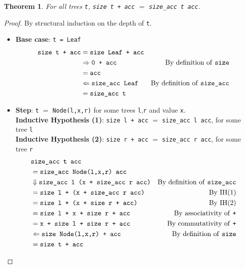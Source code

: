 \documentclass[12pt]{article}
\theoremstyle{plain}
\newtheorem*{thm}{Theorem}
\begin{document}
\onehalfspacing
\begin{thm}
  For all trees \texttt{t}, \texttt{size t + acc} $=$ \texttt{size\_acc
  t acc}.
\end{thm}
\begin{proof}
  By structural induction on the depth of \texttt{t}.
  \begin{itemize}
  \item \textbf{Base case}: \texttt{t = Leaf}
    \begin{align*}
      \texttt{size t + acc} &= \texttt{size Leaf + acc} &
      \\ & \Rightarrow
           \texttt{0 + acc} & \text{By definition of \texttt
                        {size}}
      \\ & = \texttt{acc}
      \\ & \Leftarrow \texttt{size\_acc Leaf} & \text{By                           definition of \texttt{size\_acc}}
      \\ & =
           \texttt{size\_acc
           t}
    \end{align*}
  \item \textbf{Step}: \texttt{t} $=$ \texttt{Node(l,x,r)} for some trees
    \texttt{l},\texttt{r} and value \texttt{x}.
    \\ \textbf{Inductive Hypothesis (1)}: \texttt{size l + acc} $=$
    \texttt{size\_acc l acc}, for some tree \texttt{l}
    \\ \textbf{Inductive Hypothesis (2)}: \texttt{size r + acc} $=$
    \texttt{size\_acc r acc}, for some tree \texttt{r}
      \begin{align*}
        & \texttt{size\_acc t acc}
        \\ & = \texttt{size\_acc Node(l,x,r) acc}
        \\ & \Downarrow \texttt{size\_acc l (x + size\_acc r acc)} & \text{By                                                                  definition of                                                                   \texttt{size\_acc}}
        \\ & = \texttt{size l + (x + size\_acc r acc)} & \text{By IH(1)}
        \\ & = \texttt{size l + (x + size r + acc)} & \text{By IH(2)}
        \\ & = \texttt{size l + x + size r + acc} & \text{By               associativity of \texttt{+}}
        \\ & = \texttt{x + size l + size r + acc} & \text{By                 commutativity of \texttt{+}}
        \\ & \Leftarrow \texttt{size Node(l,x,r) + acc} & \text{By definition of \texttt{size}}
        \\ & = \texttt{size t + acc} &
      \end{align*}
  \end{itemize}
\end{proof}
\end{document}
